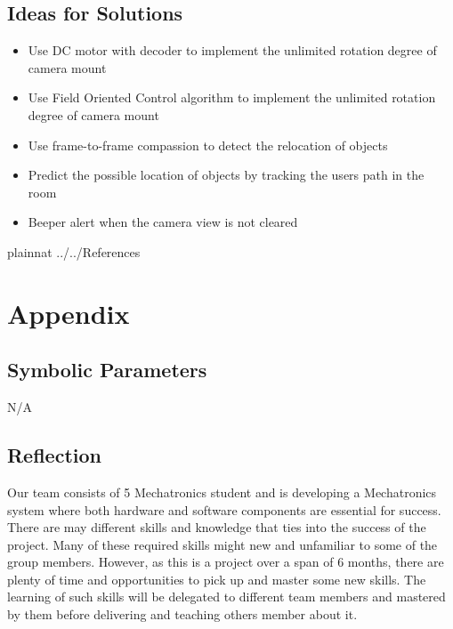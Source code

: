 \documentclass[12pt]{article}
\begin{document}
\subsection{Ideas for Solutions}
\begin{itemize}
    \item Use DC motor with decoder to implement the unlimited rotation degree of camera mount
    \item Use Field Oriented Control algorithm to implement the unlimited rotation degree of camera mount
    \item Use frame-to-frame compassion to detect the relocation of objects
    \item Predict the possible location of objects by tracking the users path in the room
    \item Beeper alert when the camera view is not cleared
\end{itemize}




\newpage

 {plainnat}
 {../../References}

\newpage

\section{Appendix}


\subsection{Symbolic Parameters}

N/A

\subsection{Reflection}

Our team consists of 5 Mechatronics student and is developing a Mechatronics system where both hardware and software components are essential for success. There are may different skills and knowledge that ties into the success of the project. Many of these required skills might new and unfamiliar to some of the group members. However, as this is a project over a span of 6 months, there are plenty of time and opportunities to pick up and master some new skills. The learning of such skills will be delegated to different team members and mastered by them before delivering and teaching others member about it.  
\end{document}
